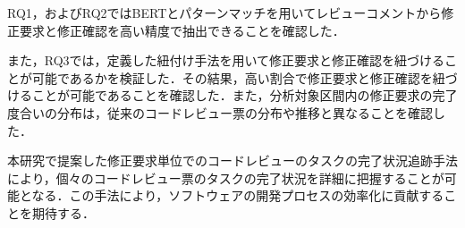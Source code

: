 \documentclass[twocolumn]{jarticle} %
\begin{document}
RQ1，およびRQ2ではBERTとパターンマッチを用いてレビューコメントから修正要求と修正確認を高い精度で抽出できることを確認した．

また，RQ3では，定義した紐付け手法を用いて修正要求と修正確認を紐づけることが可能であるかを検証した．その結果，高い割合で修正要求と修正確認を紐づけることが可能であることを確認した．また，分析対象区間内の修正要求の完了度合いの分布は，従来のコードレビュー票の分布や推移と異なることを確認した．

本研究で提案した修正要求単位でのコードレビューのタスクの完了状況追跡手法により，個々のコードレビュー票のタスクの完了状況を詳細に把握することが可能となる．この手法により，ソフトウェアの開発プロセスの効率化に貢献することを期待する．








\end{document}
